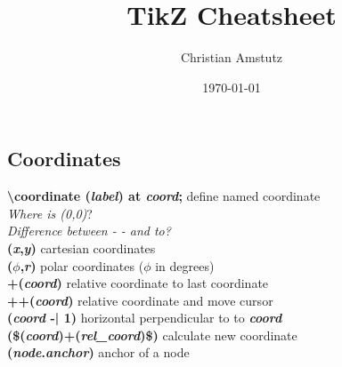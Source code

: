 \documentclass[10pt]{article}
\title{TikZ Cheatsheet}
\author{Christian Amstutz}
\date{\today}
\newcommand{\tikzcmd}[1]{\textbf{#1}}
\newcommand{\tikzparam}[1]{\textbf{\emph{#1}}}
\begin{document}
    \maketitle

    \begin{multicols}{2}

        \section{Coordinates}
        \tikzcmd{\textbackslash coordinate (\tikzparam{label}) at \tikzparam{coord};} define named coordinate\\
        \emph{Where is (0,0)}?\\
        \emph{Difference between - - and to?}\\
        \tikzcmd{(\tikzparam{x},\tikzparam{y})} cartesian coordinates\\
        \tikzcmd{(\tikzparam{$\phi$},\tikzparam{r})} polar coordinates ($\phi$ in degrees)\\
        \tikzcmd{+(\tikzparam{coord})} relative coordinate to last coordinate\\
        \tikzcmd{++(\tikzparam{coord})} relative coordinate and move cursor\\
        \tikzcmd{(\tikzparam{coord} -| 1)} horizontal perpendicular to to \tikzparam{coord}\\
        \tikzcmd{(\$(\tikzparam{coord})+(\tikzparam{rel\_coord})\$)} calculate new coordinate \\
        \tikzcmd{(\tikzparam{node}.\tikzparam{anchor})} anchor of a node


\end{multicols}
\end{document}
